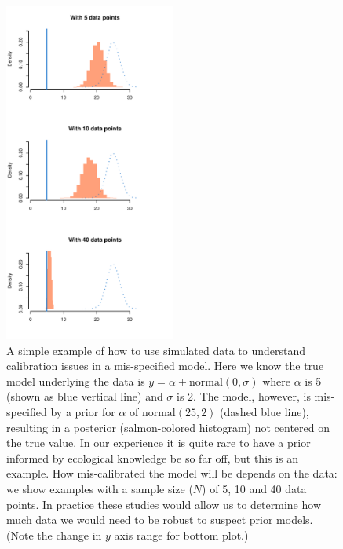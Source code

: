 \documentclass[11pt]{article}
\begin{document}
\begin{figure}[ht]
\centering
\noindent \includegraphics[width=0.5\textwidth]{examples/misspecifiedmodel/priorpostforflows.pdf}
\caption{A simple example of how to use simulated data to understand calibration issues in a mis-specified model. Here we know the true model underlying the data is $y=\alpha + \text{normal}(0, \sigma)$ where $\alpha$ is 5 (shown as blue vertical line) and $\sigma$ is 2. The model, however, is mis-specified by a prior for $\alpha$ of $\text{normal}(25, 2)$ (dashed blue line), resulting in a posterior (salmon-colored histogram) not centered on the true value. In our experience it is quite rare to have a prior informed by ecological knowledge be so far off, but this is an example. How mis-calibrated the model will be depends on the data: we show examples with a sample size ($N$) of 5, 10 and 40 data points. In practice these studies would allow us to determine how much data we would need to be robust to suspect prior models. (Note the change in $y$ axis range for bottom plot.) }
\label{fig:misspecifyprior}
\end{figure}
\end{document}
